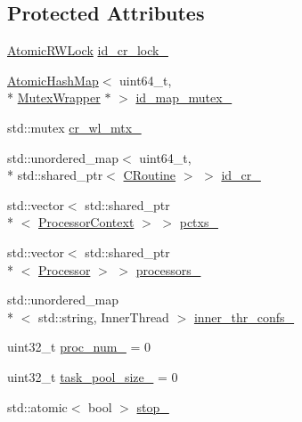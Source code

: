 \subsection*{Protected Attributes}
\begin{DoxyCompactItemize}
\item 
\hyperlink{classapollo_1_1cyber_1_1base_1_1AtomicRWLock}{Atomic\-R\-W\-Lock} \hyperlink{classapollo_1_1cyber_1_1scheduler_1_1Scheduler_a92cf81e4d1c10eabc52a89d177b83c98}{id\-\_\-cr\-\_\-lock\-\_\-}
\item 
\hyperlink{classapollo_1_1cyber_1_1base_1_1AtomicHashMap}{Atomic\-Hash\-Map}$<$ uint64\-\_\-t, \\*
\hyperlink{classapollo_1_1cyber_1_1scheduler_1_1MutexWrapper}{Mutex\-Wrapper} $\ast$ $>$ \hyperlink{classapollo_1_1cyber_1_1scheduler_1_1Scheduler_a5640ba0f6e2f95cdcd4ff2266b69944d}{id\-\_\-map\-\_\-mutex\-\_\-}
\item 
std\-::mutex \hyperlink{classapollo_1_1cyber_1_1scheduler_1_1Scheduler_ae5f6685ce7d231ef139c58beceb440f2}{cr\-\_\-wl\-\_\-mtx\-\_\-}
\item 
std\-::unordered\-\_\-map$<$ uint64\-\_\-t, \\*
std\-::shared\-\_\-ptr$<$ \hyperlink{classapollo_1_1cyber_1_1croutine_1_1CRoutine}{C\-Routine} $>$ $>$ \hyperlink{classapollo_1_1cyber_1_1scheduler_1_1Scheduler_a96af50b8cefc5466a1aed958bfb75fc0}{id\-\_\-cr\-\_\-}
\item 
std\-::vector$<$ std\-::shared\-\_\-ptr\\*
$<$ \hyperlink{classapollo_1_1cyber_1_1scheduler_1_1ProcessorContext}{Processor\-Context} $>$ $>$ \hyperlink{classapollo_1_1cyber_1_1scheduler_1_1Scheduler_aaf7682d75a76d419afc7560331fb6917}{pctxs\-\_\-}
\item 
std\-::vector$<$ std\-::shared\-\_\-ptr\\*
$<$ \hyperlink{classapollo_1_1cyber_1_1scheduler_1_1Processor}{Processor} $>$ $>$ \hyperlink{classapollo_1_1cyber_1_1scheduler_1_1Scheduler_a515178875e0beaede46654d5a1e0b788}{processors\-\_\-}
\item 
std\-::unordered\-\_\-map\\*
$<$ std\-::string, Inner\-Thread $>$ \hyperlink{classapollo_1_1cyber_1_1scheduler_1_1Scheduler_aaa79880080f0199a7024d16f69e0b067}{inner\-\_\-thr\-\_\-confs\-\_\-}
\item 
uint32\-\_\-t \hyperlink{classapollo_1_1cyber_1_1scheduler_1_1Scheduler_ab1abc585150bbf9e07bad49cf5db343c}{proc\-\_\-num\-\_\-} = 0
\item 
uint32\-\_\-t \hyperlink{classapollo_1_1cyber_1_1scheduler_1_1Scheduler_a6bc9dcb1108028aca458f1a328484e82}{task\-\_\-pool\-\_\-size\-\_\-} = 0
\item 
std\-::atomic$<$ bool $>$ \hyperlink{classapollo_1_1cyber_1_1scheduler_1_1Scheduler_adb3d43a886f633e6fcce407ac8e1d4e0}{stop\-\_\-}
\end{DoxyCompactItemize}


